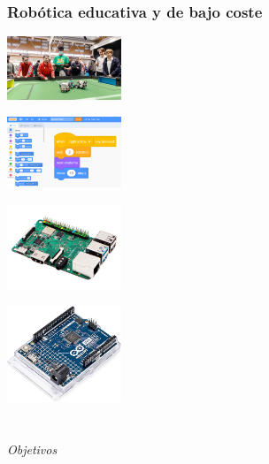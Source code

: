 \documentclass{beamer}
\begin{document}
\begin{frame}
\frametitle{Robótica educativa y de bajo coste}
\centering

\begin{minipage}{0.45\textwidth}
    \centering
    \includegraphics[width=3.4cm]{figs/RoboCup_junior.jpg}
\end{minipage}
\hfill
\begin{minipage}{0.45\textwidth}
    \centering
    \includegraphics[width=3.4cm]{figs/scratch.png}
\end{minipage}

\vspace{0.5cm} %

\begin{minipage}{0.45\textwidth}
    \centering
    \includegraphics[width=3.4cm]{figs/raspberry4.png} %
\end{minipage}
\hfill
\begin{minipage}{0.45\textwidth}
    \centering
    \includegraphics[width=3.4cm]{figs/arduino_uno.jpg} %
\end{minipage}

\end{frame}



\section*{}
\begin{frame}{}
  \centering \Huge
  \emph{Objetivos}
\end{frame}
\end{document}
